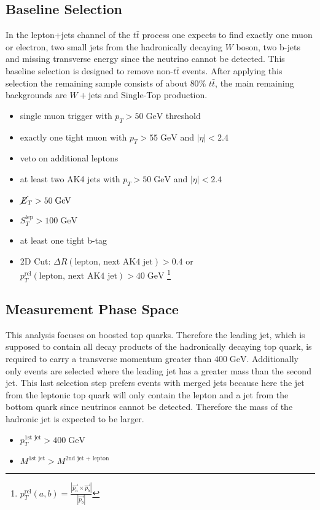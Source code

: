 \subsection{Baseline Selection}
\label{sec:PreSel}
	In the lepton+jets channel of the $t\bar{t}$ process one expects to find exactly one muon or electron, two small jets from the hadronically decaying $W$ boson, two b-jets and missing transverse energy since the neutrino cannot be detected. This baseline selection is designed to remove non-$t\bar{t}$ events. After applying this selection the remaining sample consists of about $80\%$ $t\bar{t}$, the main remaining backgrounds are $W+$jets and Single-Top production. 
	\begin{itemize}
	\item single muon trigger with $p_T > 50\;\text{GeV}$ threshold
	\item exactly one tight muon with $p_T > 55\;\text{GeV}$ and $|\eta| < 2.4$
	\item veto on additional leptons
	\item at least two AK4 jets with $p_T > 50\;\text{GeV}$ and $|\eta| < 2.4$
	\item $\cancel{E}_T > 50\;\text{GeV}$
	\item $S_T^\text{lep} > 100\;\text{GeV}$
	\item at least one tight b-tag
	\item 2D Cut: $\Delta R(\text{lepton, next AK4 jet}) > 0.4$ or $p_T^{\text{rel}}(\text{lepton, next AK4 jet}) > 40\;\text{GeV}$ \footnote{$p_T^{\text{rel}}(a,b) = \frac{|\vec{p_a} \times \vec{p_b}|}{|\vec{p_b}|}$}
	\end{itemize}

\subsection{Measurement Phase Space}
\label{sec:FinalSel}
	This analysis focuses on boosted top quarks. Therefore the leading jet, which is supposed to contain all decay products of the hadronically decaying top quark, is required to carry a transverse momentum greater than $400\;\text{GeV}$. Additionally only events are selected where the leading jet has a greater mass than the second jet. This last selection step prefers events with merged jets because here the jet from the leptonic top quark will only contain the lepton and a jet from the bottom quark since neutrinos cannot be detected. Therefore the mass of the hadronic jet is expected to be larger.
	\begin{itemize}
	\item $p_T^{\text{1st jet}} > 400\;\text{GeV}$ 
	\item $M^{\text{1st jet}} > M^{\text{2nd jet + lepton}}$
	\end{itemize}

